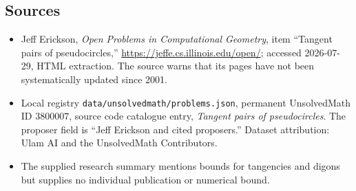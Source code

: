 \documentclass[11pt]{article}
\begin{document}
\subsection{Sources}
\begin{itemize}
\item Jeff Erickson, \emph{Open Problems in Computational Geometry}, item ``Tangent pairs of pseudocircles,'' \url{https://jeffe.cs.illinois.edu/open/}; accessed 2026-07-29, HTML extraction. The source warns that its pages have not been systematically updated since 2001.
\item Local registry \texttt{data/unsolvedmath/problems.json}, permanent UnsolvedMath ID $3800007$, source code catalogue entry, \emph{Tangent pairs of pseudocircles}. The proposer field is ``Jeff Erickson and cited proposers.'' Dataset attribution: Ulam AI and the UnsolvedMath Contributors.
\item The supplied research summary mentions bounds for tangencies and digons but supplies no individual publication or numerical bound.
\end{itemize}
\end{document}
